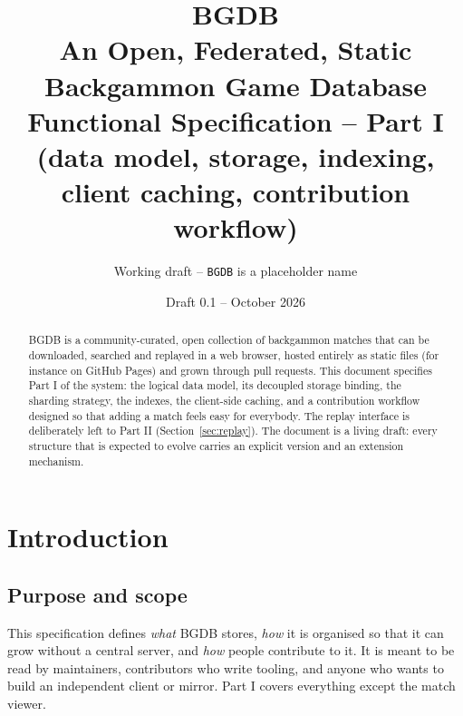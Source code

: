 \documentclass[11pt,a4paper]{article}
\title{\textbf{BGDB}\\[2pt]\large An Open, Federated, Static Backgammon Game Database\\[4pt]
\Large Functional Specification -- Part I\\[2pt]\normalsize (data model, storage, indexing, client caching, contribution workflow)}
\author{Working draft -- \texttt{BGDB} is a placeholder name}
\date{Draft 0.1 -- October 2026}
\begin{document}
\maketitle

\begin{abstract}
\noindent
BGDB is a community-curated, open collection of backgammon matches that can be downloaded, searched and replayed in a web browser, hosted entirely as static files (for instance on GitHub Pages) and grown through pull requests. This document specifies Part I of the system: the logical data model, its decoupled storage binding, the sharding strategy, the indexes, the client-side caching, and a contribution workflow designed so that adding a match feels easy for everybody. The replay interface is deliberately left to Part II (Section~\ref{sec:replay}). The document is a living draft: every structure that is expected to evolve carries an explicit version and an extension mechanism.
\end{abstract}

\tableofcontents
\clearpage

\section{Introduction}

\subsection{Purpose and scope}
This specification defines \emph{what} BGDB stores, \emph{how} it is organised so that it can grow without a central server, and \emph{how} people contribute to it. It is meant to be read by maintainers, contributors who write tooling, and anyone who wants to build an independent client or mirror. Part I covers everything except the match viewer.
\end{document}
